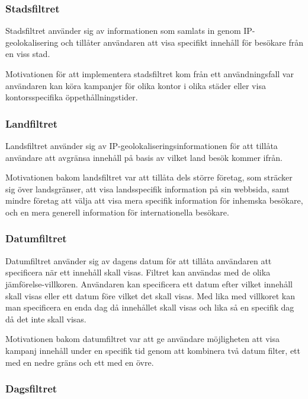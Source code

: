 \subsubsection{Stadsfiltret}

Stadsfiltret använder sig av informationen som samlats in genom IP-geolokalisering och tillåter användaren att visa specifikt innehåll för besökare från en viss stad.

Motivationen för att implementera stadsfiltret kom från ett användningsfall var användaren kan köra kampanjer för olika kontor i olika städer eller visa kontorsspecifika öppethållningstider.

\subsubsection{Landfiltret}

Landsfiltret använder sig av IP-geolokaliseringsinformationen för att tillåta användare att avgränsa innehåll på basis av vilket land besök kommer ifrån.

Motivationen bakom landsfiltret var att tillåta dels större företag, som sträcker sig över landsgränser, att visa landsspecifik information på sin webbsida, samt mindre företag att välja att visa mera specifik information för inhemska besökare, och en mera generell information för internationella besökare.

\subsubsection{Datumfiltret}

Datumfiltret använder sig av dagens datum för att tillåta användaren att specificera när ett innehåll skall visas. Filtret kan användas med de olika jämförelse-villkoren. Användaren kan specificera ett datum efter vilket innehåll skall visas eller ett datum före vilket det skall visas. Med lika med villkoret kan man specificera en enda dag då innehållet skall visas och lika så en specifik dag då det inte skall visas.

Motivationen bakom datumfiltret var att ge användare möjligheten att visa kampanj innehåll under en specifik tid genom att kombinera två datum filter, ett med en nedre gräns och ett med en övre.

\subsubsection{Dagsfiltret}


